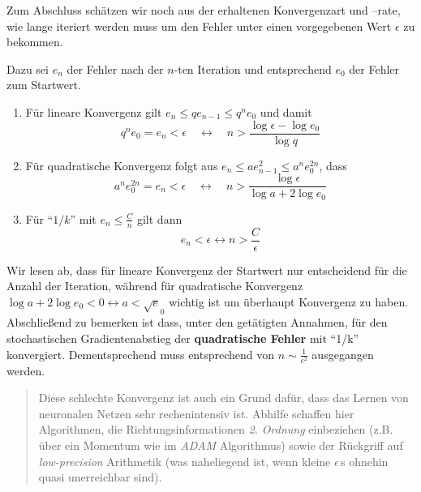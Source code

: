 \documentclass[
]{book}
\newenvironment {JHSAYS} [0] {\begin{quote}\color{jhsc}} {\end{quote}}
\theoremstyle{definition}
\theoremstyle{definition}
\theoremstyle{definition}
\theoremstyle{definition}
\theoremstyle{remark}
\begin{document}
Zum Abschluss schätzen wir noch aus der erhaltenen Konvergenzart und --rate,
wie lange iteriert werden muss um den Fehler unter einen vorgegebenen Wert
\(\epsilon\) zu bekommen.

Dazu sei \(e_{n}\) der Fehler nach der \(n\)-ten Iteration und entsprechend \(e_0\) der
Fehler zum Startwert.

\begin{enumerate}
\def\labelenumi{\arabic{enumi}.}
\item
  Für lineare Konvergenz gilt \(e_n \leq qe_{n-1} \leq q^n e_0\) und damit
  \begin{equation*}
  q^n e_0 = e_n< \epsilon \quad \leftrightarrow \quad n > \frac{\log \epsilon -
  \log e_0}{\log q}
  \end{equation*}
\item
  Für quadratische Konvergenz folgt aus \(e_n \leq ae_{n-1}^2 \leq a^n e_0^{2n}\), dass
  \begin{equation*}
  a^n e_0^{2n} = e_n< \epsilon \quad \leftrightarrow \quad n > \frac{\log \epsilon}{\log a + 2\log e_0}
  \end{equation*}
\item
  Für ``\(1/k\)'' mit \(e_n\leq \frac {C}{n}\) gilt dann
  \begin{equation*}
  e_n < \epsilon \leftrightarrow n > \frac{C}{\epsilon}
  \end{equation*}
\end{enumerate}

Wir lesen ab, dass für lineare Konvergenz der Startwert nur entscheidend
für die Anzahl der Iteration, während für quadratische Konvergenz
\(\log a + 2 \log e_0 < 0 \leftrightarrow a < \sqrt e_0\) wichtig ist um
überhaupt Konvergenz zu haben. Abschließend zu bemerken ist dass,
unter den getätigten Annahmen, für den stochastischen Gradientenabstieg der \textbf{quadratische Fehler} mit ``1/k'' konvergiert. Dementsprechend muss entsprechend von \(n\sim \frac{1}{\epsilon^2}\) ausgegangen werden.

\leavevmode{}%
\begin{JHSAYS}
Diese schlechte Konvergenz ist auch ein Grund dafür, dass das Lernen von
neuronalen Netzen sehr rechenintensiv ist. Abhilfe schaffen hier Algorithmen,
die Richtungsinformationen \emph{2. Ordnung} einbeziehen (z.B. über ein Momentum
wie im \emph{ADAM} Algorithmus) sowie der Rückgriff auf \emph{low-precision}
Arithmetik (was naheliegend ist, wenn kleine \(\epsilon\,\)s ohnehin quasi unerreichbar
sind).

\end{JHSAYS}
\end{document}
